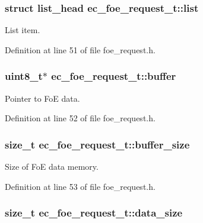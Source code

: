 \subsubsection[{list}]{\setlength{\rightskip}{0pt plus 5cm}struct list\-\_\-head ec\-\_\-foe\-\_\-request\-\_\-t\-::list}\label{structec__foe__request__t_a3934835725b006bc6268d2553234901a}


List item. 



Definition at line 51 of file foe\-\_\-request.\-h.

\subsubsection[{buffer}]{\setlength{\rightskip}{0pt plus 5cm}uint8\-\_\-t$\ast$ ec\-\_\-foe\-\_\-request\-\_\-t\-::buffer}\label{structec__foe__request__t_a9f6af09dc6347bb9139f488c7ca48427}


Pointer to Fo\-E data. 



Definition at line 52 of file foe\-\_\-request.\-h.

\subsubsection[{buffer\-\_\-size}]{\setlength{\rightskip}{0pt plus 5cm}size\-\_\-t ec\-\_\-foe\-\_\-request\-\_\-t\-::buffer\-\_\-size}\label{structec__foe__request__t_a5cf1b56bd0f3406f9cf36650fc5ac7aa}


Size of Fo\-E data memory. 



Definition at line 53 of file foe\-\_\-request.\-h.

\subsubsection[{data\-\_\-size}]{\setlength{\rightskip}{0pt plus 5cm}size\-\_\-t ec\-\_\-foe\-\_\-request\-\_\-t\-::data\-\_\-size}\label{structec__foe__request__t_aa7b6efa4a99fe568f8f53ae0b2ebc2e4}



